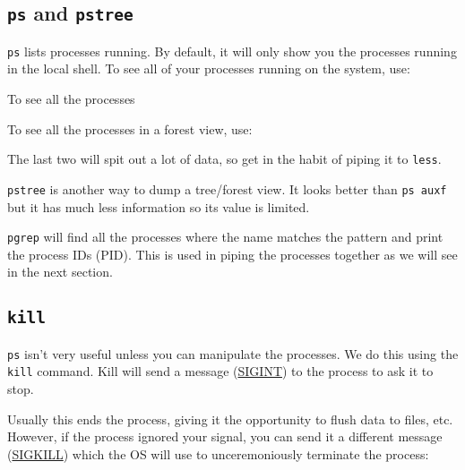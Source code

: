 \subsection{\texttt{ps} and \texttt{pstree}}
\verb|ps| lists processes running. By default, it will only show you the processes
running in the local shell. To see all of your processes running on the system,
use:

\begin{prompt}
\end{prompt}

To see all the processes

\begin{prompt}
\end{prompt}

To see all the processes in a forest view, use:

\begin{prompt}
\end{prompt}

The last two will spit out a lot of data, so get in the habit of piping it to
\verb|less|.

\verb|pstree| is another way to dump a tree/forest view. It looks better than
\verb|ps auxf| but it has much less information so its value is limited.

\verb|pgrep| will find all the processes where the name matches the pattern and
print the process IDs (PID). This is used in piping the processes together as we
will see in the next section.

\subsection{\texttt{kill}}
\verb|ps| isn't very useful unless you can manipulate the processes. We do this
using the \verb|kill| command. Kill will send a message
(\href{https://en.wikipedia.org/wiki/Unix_signal#POSIX_signals}{SIGINT}) to the
process to ask it to stop.

\begin{prompt}
\end{prompt}

Usually this ends the process, giving it the opportunity to flush data to files,
etc. However, if the process ignored your signal, you can send it a different
message (\href{https://en.wikipedia.org/wiki/Unix_signal#POSIX_signals}{SIGKILL}) which the OS
will use to unceremoniously terminate the process:

